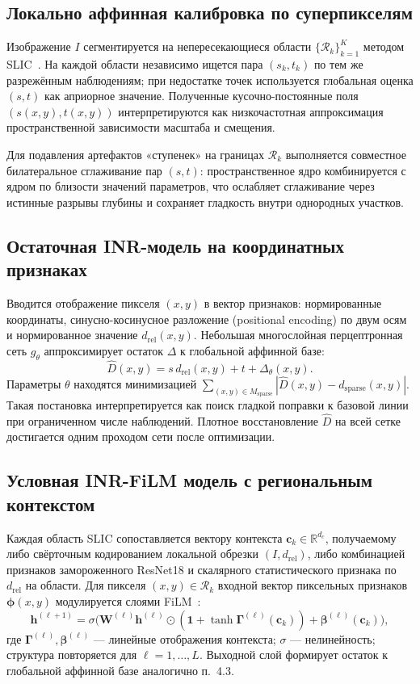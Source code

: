 \documentclass[12pt]{article}
\begin{document}
\subsection{Локально аффинная калибровка по суперпикселям}

Изображение $I$ сегментируется на непересекающиеся области $\{\mathcal{R}_k\}_{k=1}^K$ методом SLIC~\cite{achanta2012slic}. На каждой области независимо ищется пара $(s_k,t_k)$ по тем же разрежённым наблюдениям; при недостатке точек используется глобальная оценка $(s,t)$ как априорное значение. Полученные кусочно-постоянные поля $(s(x,y),t(x,y))$ интерпретируются как низкочастотная аппроксимация пространственной зависимости масштаба и смещения.

Для подавления артефактов «ступенек» на границах $\mathcal{R}_k$ выполняется совместное билатеральное сглаживание пар $(s,t)$: пространственное ядро комбинируется с ядром по близости значений параметров, что ослабляет сглаживание через истинные разрывы глубины и сохраняет гладкость внутри однородных участков.

\subsection{Остаточная INR-модель на координатных признаках}

Вводится отображение пикселя $(x,y)$ в вектор признаков: нормированные координаты, синусно-косинусное разложение (positional encoding) по двум осям и нормированное значение $d_{\mathrm{rel}}(x,y)$. Небольшая многослойная перцептронная сеть $g_\theta$ аппроксимирует остаток $\Delta$ к глобальной аффинной базе:
\[
  \hat D(x,y) = s\, d_{\mathrm{rel}}(x,y) + t + \Delta_\theta(x,y).
\]
Параметры $\theta$ находятся минимизацией $\sum_{(x,y)\in M_{\mathrm{sparse}}} |\hat D(x,y)-d_{\mathrm{sparse}}(x,y)|$. Такая постановка интерпретируется как поиск гладкой поправки к базовой линии при ограниченном числе наблюдений. Плотное восстановление $\hat D$ на всей сетке достигается одним проходом сети после оптимизации.

\subsection{Условная INR-FiLM модель с региональным контекстом}

Каждая область SLIC сопоставляется вектору контекста $\mathbf{c}_k\in\mathbb{R}^{d_c}$, получаемому либо свёрточным кодированием локальной обрезки $(I, d_{\mathrm{rel}})$, либо комбинацией признаков замороженного ResNet18 и скалярного статистического признака по $d_{\mathrm{rel}}$ на области. Для пикселя $(x,y)\in\mathcal{R}_k$ входной вектор пиксельных признаков $\boldsymbol{\phi}(x,y)$ модулируется слоями FiLM~\cite{perez2018film}:
\[
  \mathbf{h}^{(\ell+1)} = \sigma\!\bigl(\mathbf{W}^{(\ell)}\mathbf{h}^{(\ell)} \odot (\mathbf{1}+\tanh \boldsymbol{\Gamma}^{(\ell)}(\mathbf{c}_k)) + \boldsymbol{\beta}^{(\ell)}(\mathbf{c}_k)\bigr),
\]
где $\boldsymbol{\Gamma}^{(\ell)}, \boldsymbol{\beta}^{(\ell)}$ --- линейные отображения контекста; $\sigma$ --- нелинейность; структура повторяется для $\ell=1,\ldots,L$. Выходной слой формирует остаток к глобальной аффинной базе аналогично п.~4.3.
\end{document}
